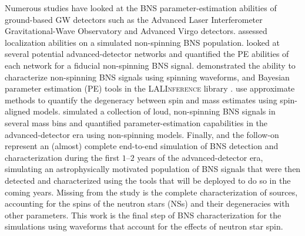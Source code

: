 Numerous studies have looked at the BNS parameter-estimation abilities of ground-based GW detectors such as the Advanced Laser Interferometer Gravitational-Wave Observatory \citep[aLIGO;][]{Aasi_2015} and Advanced Virgo \citep[AdV;][]{Acernese_2014} detectors. \citet{Nissanke_2010,Nissanke_2011} assessed localization abilities on a simulated non-spinning BNS population.  \citet{Veitch_2012} looked at several potential advanced-detector networks and quantified the PE abilities of each network for a fiducial non-spinning BNS signal.  \citet{Aasi_2013} demonstrated the ability to characterize non-spinning BNS signals using spinning waveforms, and Bayesian parameter estimation (PE) tools in the \textsc{LALInference} library \cite{Veitch_2014}.   \citet{Hannam_2013} use approximate methods to quantify the degeneracy between spin and mass estimates using spin-aligned models.  \citet{Rodriguez_2014} simulated a collection of loud, non-spinning BNS signals in several mass bins and quantified parameter-estimation capabilities in the advanced-detector era using non-spinning models.  Finally, \citet{Singer_2014} and the follow-on \citet{Berry_2014} represent an (almost) complete end-to-end simulation of BNS detection and characterization during the first $1$--$2$ years of the advanced-detector era, simulating an astrophysically motivated population of BNS signals that were then detected and characterized using the tools that will be deployed to do so in the coming years.   Missing from the \citet{Singer_2014} study is the complete characterization of sources, accounting for the spins of the neutron stars (NSs) and their degeneracies with other parameters.  This work is the final step of BNS characterization for the \citet{Singer_2014} simulations using waveforms that account for the effects of neutron star spin.